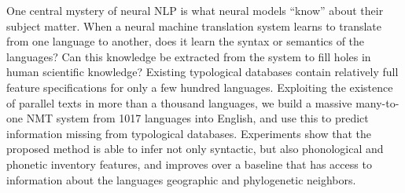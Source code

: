 One central mystery of neural NLP is what neural models ``know'' about their subject matter. When a neural machine translation system learns to translate from one language to another, does it learn the syntax or semantics of the languages? Can this knowledge be extracted from the system to fill holes in human scientific knowledge? Existing typological databases contain relatively full feature specifications for only a few hundred languages. Exploiting the existence of parallel texts in more than a thousand languages, we build a massive many-to-one NMT system from 1017 languages into English, and use this to predict information missing from typological databases. Experiments show that the proposed method is able to infer not only syntactic, but also phonological and phonetic inventory features, and improves over a baseline that has access to information about the languages geographic and phylogenetic neighbors.
